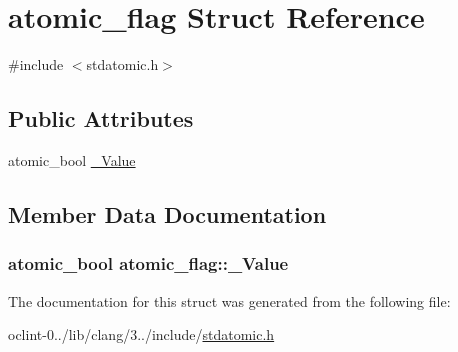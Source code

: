 \hypertarget{structatomic__flag}{\section{atomic\-\_\-flag Struct Reference}
\label{structatomic__flag}
}


{\ttfamily \#include $<$stdatomic.\-h$>$}

\subsection*{Public Attributes}
\begin{DoxyCompactItemize}
\item 
atomic\-\_\-bool \hyperlink{structatomic__flag_a1d4d97877856c5c78f85ae60687c1a0a}{\-\_\-\-Value}
\end{DoxyCompactItemize}


\subsection{Member Data Documentation}
\hypertarget{structatomic__flag_a1d4d97877856c5c78f85ae60687c1a0a}{
\subsubsection[{\-\_\-\-Value}]{\setlength{\rightskip}{0pt plus 5cm}atomic\-\_\-bool atomic\-\_\-flag\-::\-\_\-\-Value}}\label{structatomic__flag_a1d4d97877856c5c78f85ae60687c1a0a}


The documentation for this struct was generated from the following file\-:\begin{DoxyCompactItemize}
\item 
oclint-\/0../lib/clang/3../include/\hyperlink{stdatomic_8h}{stdatomic.\-h}\end{DoxyCompactItemize}
